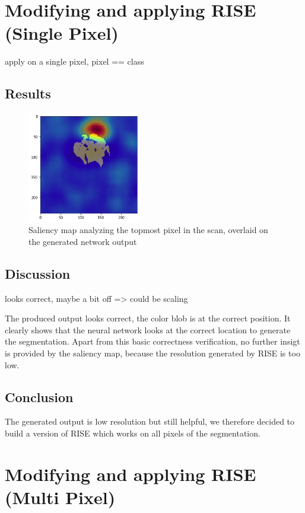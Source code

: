 \section{Modifying and applying RISE (Single Pixel)}

apply on a single pixel, pixel == class

\subsection{Results}

\begin{figure}[H]
\centering
\includegraphics[width=5cm]{chapters/04_segmentation/images/rise_single_pixel.png}
\caption{Saliency map analyzing the topmost pixel in the scan, overlaid on the generated network output}
\end{figure}



\subsection{Discussion}
looks correct, maybe a bit off => could be scaling

The produced output looks correct, the color blob is at the correct position. It clearly shows that the neural network looks at the correct location to generate the segmentation.
Apart from this basic correctness verification, no further insigt is provided by the saliency map, because the resolution generated by RISE is too low.

\subsection{Conclusion}
The generated output is low resolution but still helpful, we therefore decided to build a version of RISE which works on all pixels of the segmentation.

\section{Modifying and applying RISE (Multi Pixel)}

